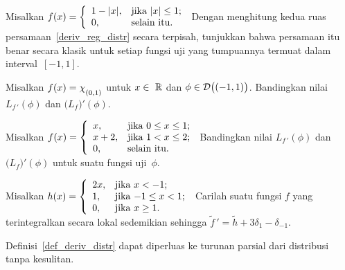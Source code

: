 \begin{exer} Misalkan $f(x) = \left\{
                           \begin{array}{ll}
                             1 - \lvert x\rvert, & \hbox{jika $\lvert x\rvert \le 1$;} \\
                                 0,      & \hbox{selain itu.}
                           \end{array}
                         \right.$ Dengan menghitung kedua ruas persamaan~\eqref{deriv_reg_distr} secara terpisah, tunjukkan bahwa persamaan itu
benar secara klasik untuk setiap fungsi uji yang tumpuannya termuat dalam interval~$[-1,1]$.
\end{exer}

\begin{exer} Misalkan $f(x) = \chi_{{}_{\scriptstyle{(0,1)}}}$ untuk $x \in~\mathbb{R}$ dan $\phi \in \mathcal{D}\bigl((-1,1)\bigr)$. Bandingkan nilai $L_{f\,'}(\phi)$ dan
$\bigl(L_f\bigr)'(\phi)$.
\end{exer}

\begin{exer} Misalkan $f(x) = \left\{
                           \begin{array}{ll}
                             x, & \hbox{jika $0 \le x \le 1$;} \\
                             x + 2, & \hbox{jika $1 < x \le 2$;} \\
                             0, & \hbox{selain itu.}
                           \end{array}
                         \right.$ Bandingkan nilai $L_{f\,'}(\phi)$ dan $\bigl(L_f\bigr)'(\phi)$ untuk suatu fungsi uji~$\phi$.
\end{exer}

\begin{exer} Misalkan $h(x) = \left\{
                           \begin{array}{ll}
                             2x, & \hbox{jika $x < -1$;} \\
                             1, & \hbox{jika $-1 \le x < 1$;} \\
                             0, & \hbox{jika $x \ge 1$.}
                           \end{array}
                         \right.$ Carilah suatu fungsi $f$ yang terintegralkan secara lokal sedemikian sehingga ${\tilde f}\,' = \tilde h + 3\delta_1 - \delta_{-1}$.
\end{exer}

Definisi~\ref{def_deriv_distr} dapat diperluas ke turunan parsial dari distribusi tanpa kesulitan.

